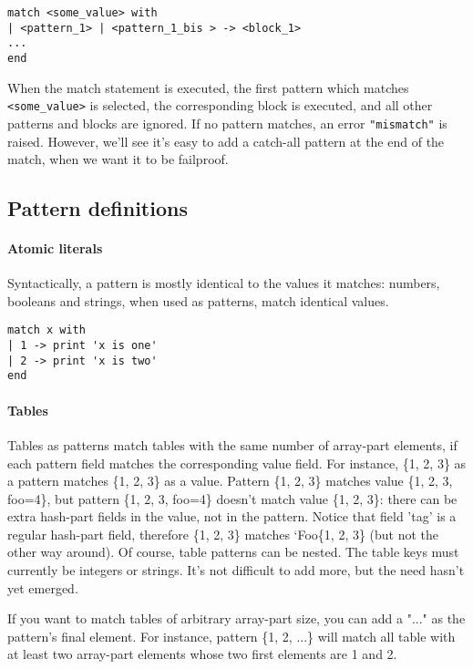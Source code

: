\begin{verbatim}
match <some_value> with
| <pattern_1> | <pattern_1_bis > -> <block_1>
...
end
\end{verbatim}

When the match statement is executed, the first pattern which matches
{\tt<some\_value>} is selected, the corresponding block is executed, and all
other patterns and blocks are ignored. If no pattern matches, an error
{\tt"mismatch"} is raised. However, we'll see it's easy to add a catch-all
pattern at the end of the match, when we want it to be failproof.

\subsection{Pattern definitions}

\paragraph{Atomic literals}
Syntactically, a pattern is mostly identical to the values it matches: numbers,
booleans and strings, when used as patterns, match identical values.

\begin{verbatim}
match x with
| 1 -> print 'x is one'
| 2 -> print 'x is two'
end
\end{verbatim}

\paragraph{Tables}
Tables as patterns match tables with the same number of array-part elements, if
each pattern field matches the corresponding value field. For instance, \{1, 2,
3\} as a pattern matches \{1, 2, 3\} as a value. Pattern \{1, 2, 3\} matches
value \{1, 2, 3, foo=4\}, but pattern \{1, 2, 3, foo=4\} doesn't match value
\{1, 2, 3\}: there can be extra hash-part fields in the value, not in the
pattern. Notice that field 'tag' is a regular hash-part field, therefore \{1, 2,
3\} matches `Foo\{1, 2, 3\} (but not the other way around). Of course, table
patterns can be nested. The table keys must currently be integers or strings.
It's not difficult to add more, but the need hasn't yet emerged.

If you want to match tables of arbitrary array-part size, you can add a "..." as
the pattern's final element. For instance, pattern \{1, 2, ...\} will match all
table with at least two array-part elements whose two first elements are 1 and
2.

